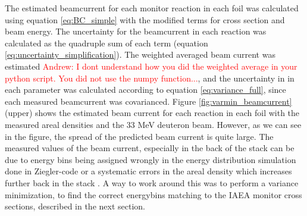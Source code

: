 The estimated beamcurrent for each monitor reaction in each foil was calculated using equation \ref{eq:BC_simple} with the modified terms for cross section and beam energy. The uncertainty for the beamcurrent in each reaction was calculated as the quadruple sum of each term (equation \ref{eq:uncertainty_simplification}). The weighted averaged beam current was estimated \textcolor{red}{Andrew: I dont understand how you did the weighted average in your python script. You did not use the numpy function...}, and the uncertainty in in each parameter was calculated according to equation \ref{eq:variance_full}, since each measured beamcurrent was covarianced. Figure \ref{fig:varmin_beamcurrent} (upper) shows the estimated beam current for each reaction in each foil with the measured areal densities and the 33 MeV deuteron beam. However, as we can see in the figure, the spread of the predicted beam current is quite large. The measured values of the beam current, especially in the back of the stack can be due to energy bins being assigned wrongly in the energy distribution simulation done in Ziegler-code or a systematic errors in the areal density which increases further back in the stack \cite{Voyles2018c}. A way to work around this was to perform a variance minimization, to find the correct energybins matching to the IAEA monitor cross sections, described in the next section.  

